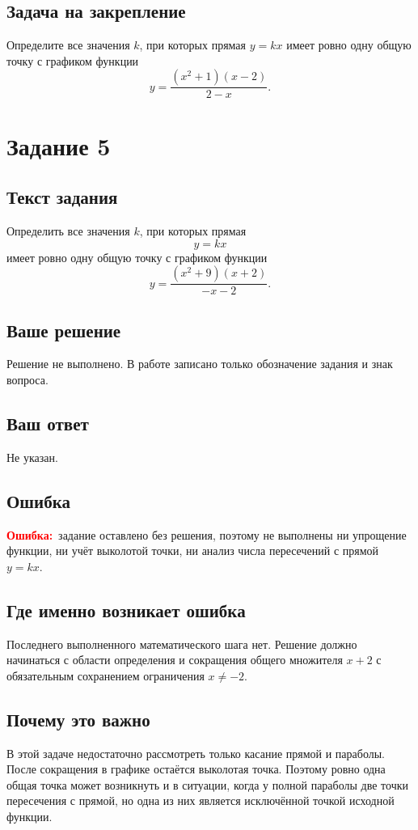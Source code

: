 \documentclass[12pt,a4paper]{article}
\newcommand{\errlabel}{\textcolor{red}{\textbf{Ошибка:}}}
\begin{document}
\subsection*{Задача на закрепление}
Определите все значения $k$, при которых прямая $y=kx$ имеет ровно одну общую точку с графиком функции
\[
y=\frac{(x^2+1)(x-2)}{2-x}.
\]

\newpage
{}\label{task:5}
\section*{Задание 5}

\subsection*{Текст задания}
Определить все значения $k$, при которых прямая
\[
y=kx
\]
имеет ровно одну общую точку с графиком функции
\[
y=\frac{(x^2+9)(x+2)}{-x-2}.
\]

\subsection*{Ваше решение}
Решение не выполнено. В работе записано только обозначение задания и знак вопроса.

\subsection*{Ваш ответ}
Не указан.

\subsection*{Ошибка}
\errlabel\ задание оставлено без решения, поэтому не выполнены ни упрощение функции, ни учёт выколотой точки, ни анализ числа пересечений с прямой $y=kx$.

\subsection*{Где именно возникает ошибка}
Последнего выполненного математического шага нет. Решение должно начинаться с области определения и сокращения общего множителя $x+2$ с обязательным сохранением ограничения $x\ne-2$.

\subsection*{Почему это важно}
В этой задаче недостаточно рассмотреть только касание прямой и параболы. После сокращения в графике остаётся выколотая точка. Поэтому ровно одна общая точка может возникнуть и в ситуации, когда у полной параболы две точки пересечения с прямой, но одна из них является исключённой точкой исходной функции.
\end{document}
